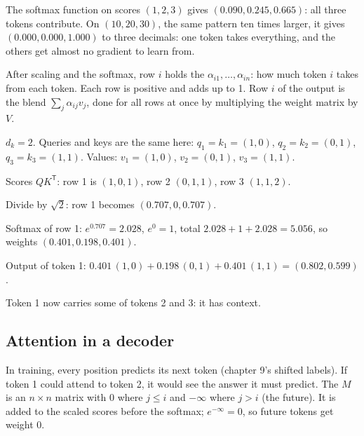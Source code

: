 \begin{example}
The softmax function on scores $(1, 2, 3)$ gives $(0.090, 0.245, 0.665)$: all three tokens contribute. On $(10, 20, 30)$, the same pattern ten times larger, it gives $(0.000, 0.000, 1.000)$ to three decimals: one token takes everything, and the others get almost no gradient to learn from.
\end{example}

\begin{definition}
After scaling and the softmax, row $i$ holds the  $\alpha_{i1}, \dots, \alpha_{in}$: how much token $i$ takes from each token. Each row is positive and adds up to 1. Row $i$ of the output is the blend $\sum_j \alpha_{ij} v_j$, done for all rows at once by multiplying the weight matrix by $V$.
\end{definition}

\begin{example}
$d_k = 2$. Queries and keys are the same here: $q_1 = k_1 = (1, 0)$, $q_2 = k_2 = (0, 1)$, $q_3 = k_3 = (1, 1)$. Values: $v_1 = (1, 0)$, $v_2 = (0, 1)$, $v_3 = (1, 1)$.
\begin{steps}
  \item Scores $QK^{\mathsf T}$: row 1 is $(1, 0, 1)$, row 2 $(0, 1, 1)$, row 3 $(1, 1, 2)$.
  \item Divide by $\sqrt 2$: row 1 becomes $(0.707, 0, 0.707)$.
  \item Softmax of row 1: $e^{0.707} = 2.028$, $e^0 = 1$, total $2.028 + 1 + 2.028 = 5.056$, so weights $(0.401, 0.198, 0.401)$.
  \item Output of token 1: $0.401\,(1, 0) + 0.198\,(0, 1) + 0.401\,(1, 1) = (0.802, 0.599)$.
\end{steps}
Token 1 now carries some of tokens 2 and 3: it has context.
\end{example}

\subsection*{Attention in a decoder}

\begin{definition}
In training, every position predicts its next token (chapter 9's shifted labels). If token 1 could attend to token 2, it would see the answer it must predict. The  $M$ is an $n \times n$ matrix with $0$ where $j \le i$ and $-\infty$ where $j > i$ (the future). It is added to the scaled scores before the softmax; $e^{-\infty} = 0$, so future tokens get weight 0.
\end{definition}

